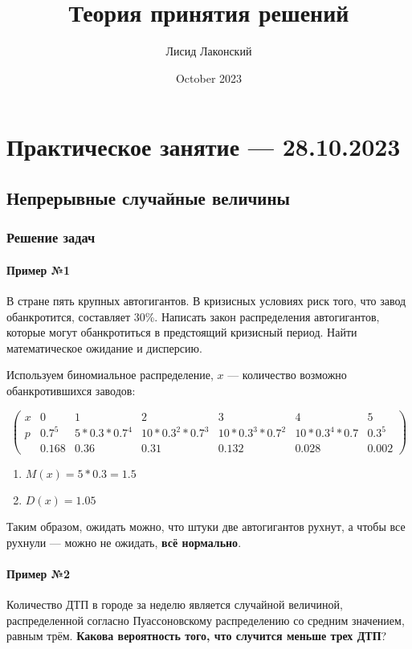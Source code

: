\documentclass{article}
\title{Теория принятия решений}
\author{Лисид Лаконский}
\date{October 2023}
\begin{document}
\raggedright

\maketitle

\tableofcontents
\pagebreak

\section{Практическое занятие — 28.10.2023}

\subsection{Непрерывные случайные величины}

\subsubsection{Решение задач}

\paragraph{Пример №1} В стране пять крупных автогигантов. В кризисных условиях риск того, что завод обанкротится, составляет 30\%. Написать закон распределения автогигантов, которые могут обанкротиться в предстоящий кризисный период. Найти математическое ожидание и дисперсию.

Используем биномиальное распределение, $x$ — количество возможно обанкротившихся заводов:

$$
\begin{pmatrix}
  x & 0 & 1 & 2 & 3 & 4 & 5 \\
  p & 0.7^5 & 5*0.3*0.7^4 & 10*0.3^2*0.7^3 & 10*0.3^3*0.7^2 & 10*0.3^4*0.7 & 0.3^5  \\
    & 0.168 & 0.36 & 0.31 & 0.132 & 0.028 & 0.002
\end{pmatrix}
$$

\begin{enumerate}
    \item $M(x) = 5 * 0.3 = 1.5$
    \item $D(x) = 1.05$
\end{enumerate}

Таким образом, ожидать можно, что штуки две автогигантов рухнут, а чтобы все рухнули — можно не ожидать, \textbf{всё нормально}.

\paragraph{Пример №2} Количество ДТП в городе за неделю является случайной величиной, распределенной согласно Пуассоновскому распределению со средним значением, равным трём. \textbf{Какова вероятность того, что случится меньше трех ДТП}?
\end{document}
